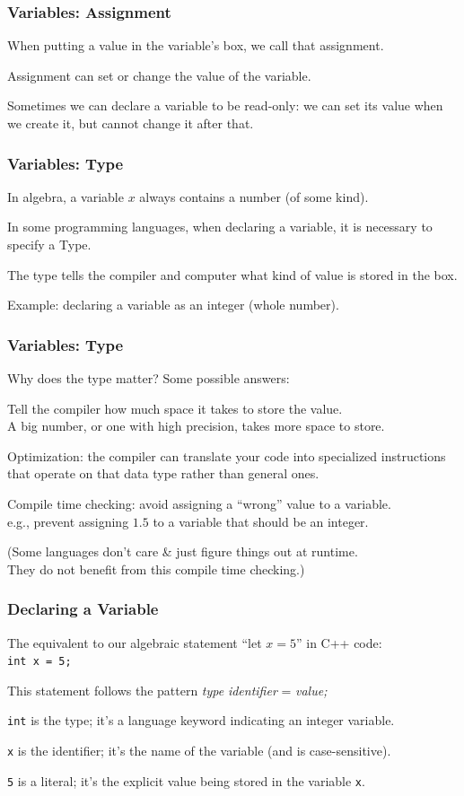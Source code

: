 \begin{frame}
\frametitle{Variables: Assignment}

When putting a value in the variable's box, we call that \alert{assignment}.

Assignment can set or change the value of the variable.

Sometimes we can declare a variable to be \alert{read-only}: we can set its value when we create it, but cannot change it after that.

\end{frame}

\begin{frame}
\frametitle{Variables: Type}

In algebra, a variable $x$ always contains a number (of some kind).

In some programming languages, when declaring a variable, it is necessary to specify a \alert{Type}.

The type tells the compiler and computer what kind of value is stored in the box.

Example: declaring a variable as an \alert{integer} (whole number).

\end{frame}

\begin{frame}
\frametitle{Variables: Type}

Why does the type matter? Some possible answers:

Tell the compiler how much space it takes to store the value.\\
\quad A big number, or one with high precision, takes more space to store.

Optimization: the compiler can translate your code into specialized instructions that operate on that data type rather than general ones.

Compile time checking: avoid assigning a ``wrong'' value to a variable.\\ \quad e.g., prevent assigning $1.5$ to a variable that should be an integer.

(Some languages don't care \& just figure things out at runtime. \\They do not benefit from this compile time checking.)

\end{frame}

\begin{frame}
\frametitle{Declaring a Variable}
The equivalent to our algebraic statement ``let $x = 5$'' in C++ code:\\
\quad \texttt{int x = 5;}

This statement follows the pattern \textit{type} \textit{identifier} = \textit{value;}

\texttt{int} is the type; it's a language keyword indicating an integer variable.

\texttt{x} is the identifier; it's the name of the variable (and is case-sensitive).

\texttt{5} is a literal; it's the explicit value being stored in the variable \texttt{x}.

\end{frame}

